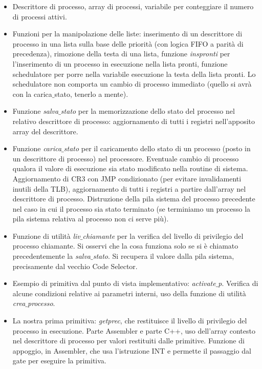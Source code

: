 \documentclass[11pt]{report}
\theoremstyle{definition}
\begin{document}
\begin{itemize}
\begin{itemize}
\begin{itemize}
			\item Descrittore di processo, array di processi, variabile per conteggiare il numero di processi attivi.
			\item Funzioni per la manipolazione delle liste: inserimento di un descrittore di processo in una lista sulla base delle priorità (con logica FIFO a parità di precedenza), rimozione della testa di una lista, funzione \emph{inspronti} per l'inserimento di un processo in esecuzione nella lista pronti, funzione schedulatore per porre nella variabile esecuzione la testa della lista pronti. Lo schedulatore non comporta un cambio di processo immediato (quello si avrà con la carica$\_$stato, tenerlo a mente).
			\item Funzione \emph{salva$\_$stato} per la memorizzazione dello stato del processo nel relativo descrittore di processo: aggiornamento di tutti i registri nell'apposito array del descrittore.
			\item Funzione \emph{carica$\_$stato} per il caricamento dello stato di un processo (posto in un descrittore di processo) nel processore. Eventuale cambio di processo qualora il valore di esecuzione sia stato modificato nella routine di sistema. Aggiornamento di CR3 con JMP condizionato (per evitare invalidamenti inutili della TLB), aggiornamento di tutti i registri a partire dall'array nel descrittore di processo. Distruzione della pila sistema del processo precedente nel caso in cui il processo sia stato terminato (se terminiamo un processo la pila sistema relativa al processo non ci serve più).
			\item Funzione di utilità \emph{liv$\_$chiamante} per la verifica del livello di privilegio del processo chiamante. Si osservi che la cosa funziona solo se si è chiamato precedentemente la \emph{salva$\_$stato}. Si recupera il valore dalla pila sistema, precisamente dal vecchio Code Selector.
			\item Esempio di primitiva dal punto di vista implementativo: \emph{activate$\_$p}. Verifica di alcune condizioni relative ai parametri interni, uso della funzione di utilità \emph{crea$\_$processo}.
			\item La nostra prima primitiva: \emph{getprec}, che restituisce il livello di privilegio del processo in esecuzione. Parte Assembler e parte C++, uso dell'array contesto nel descrittore di processo per valori restituiti dalle primitive. Funzione di appoggio, in Assembler, che usa l'istruzione INT e permette il passaggio dal gate per eseguire la primitiva.
		\end{itemize}
	\end{itemize}


\end{itemize}
\end{document}
